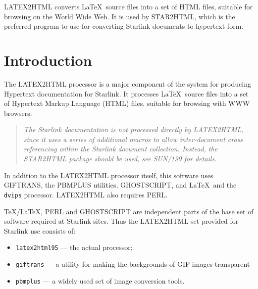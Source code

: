 \documentclass[twoside,11pt]{article}
\newcommand{\stardocinitials}  {SUN}
\newcommand{\stardocnumber}    {201.1}
\newcommand{\stardocabstract}  {LATEX2HTML converts \LaTeX\ source files
into a set of HTML files, suitable for browsing on the World Wide Web.
It is used by STAR2HTML, which is the preferred program to use for
converting Starlink documents to hypertext form.}
\newcommand{\stardocname}{\stardocinitials /\stardocnumber}
\newenvironment{latexonly}{}{}
\newcommand{\xref}[3]{#1}
\newcommand{\xlabel}[1]{}
\renewcommand{\thepage}{\roman{page}}
\begin{document}
\stardocabstract
\newpage
\begin{latexonly}
   \setlength{\parskip}{0mm}
   \tableofcontents
   \setlength{\parskip}{\medskipamount}
   \markright{\stardocname}
\end{latexonly}
\newpage
\renewcommand{\thepage}{\arabic{page}}
\setcounter{page}{1}

\section{Introduction\xlabel{introduction}}

The LATEX2HTML processor is a major component of the system for producing
Hypertext documentation for Starlink.  It processes \LaTeX\ source files
into a set of Hypertext Markup Language (HTML) files, suitable for browsing
with WWW browsers.  

\begin{quote}
{\em The Starlink documentation is not processed directly by LATEX2HTML,
since it uses a series of additional macros to allow inter-document
cross referencing within the Starlink document collection.  Instead,
the STAR2HTML package should be used, see \xref{SUN/199}{sun199}{} for details.}
\end{quote}

In addition to the LATEX2HTML processor itself, this software uses
GIFTRANS, the PBMPLUS utilities, GHOSTSCRIPT, and \LaTeX\ and the {\tt
dvips} processor.  LATEX2HTML also requires PERL.

\TeX/\LaTeX, PERL and GHOSTSCRIPT are independent parts of the base set
of software required at Starlink sites.  Thus the LATEX2HTML set provided for
Starlink use consists of:

\begin{itemize}

\item {\tt latex2html95} --- the actual processor;

\item {\tt giftrans} --- a utility for making the backgrounds of GIF
images transparent

\item {\tt pbmplus} --- a widely used set of image conversion tools.

\end{itemize}
\end{document}

